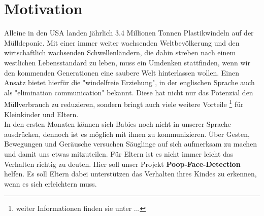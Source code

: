 \section{Motivation}
\label{sec:Motivation}
Alleine in den USA landen jährlich 3.4 Millionen Tonnen Plastikwindeln auf der Mülldeponie. Mit einer immer weiter wachsenden Weltbevölkerung und den wirtschaftlich wachsenden Schwellenländern, die dahin streben nach einem westlichen Lebensstandard zu leben,
muss ein Umdenken stattfinden, wenn wir den kommenden Generationen eine saubere Welt hinterlassen wollen. Einen Ansatz bietet hierfür die "windelfreie Erziehung", in der englischen Sprache auch als "elimination communication" bekannt. Diese hat nicht nur das Potenzial den Müllverbrauch zu reduzieren, sondern bringt auch viele weitere Vorteile \footnote{ weiter Informationen finden sie unter ... } für Kleinkinder und Eltern. \\

In den ersten Monaten können sich Babies noch nicht in unserer Sprache ausdrücken, dennoch ist es möglich mit ihnen zu kommunizieren. Über Gesten, Bewegungen und Geräusche versuchen Säuglinge auf sich aufmerksam zu machen und damit uns etwas mitzuteilen. Für Eltern ist es nicht immer leicht das Verhalten richtig zu deuten. Hier soll unser Projekt \textbf{Poop-Face-Detection} helfen. Es soll Eltern dabei unterstützen das Verhalten ihres Kindes zu erkennen, wenn es sich erleichtern muss.

